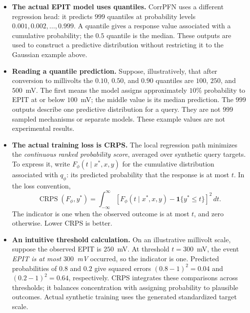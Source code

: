 \documentclass[11pt]{article}
\newenvironment{notes}
  {\begin{itemize}\setlength{\itemsep}{0.45em}\setlength{\parsep}{0pt}}
  {\end{itemize}}
\begin{document}
\begin{notes}
    \item \textbf{The actual EPIT model uses quantiles.}
    CorrPFN uses a different regression head: it predicts
    \(999\) quantiles at probability levels
    \(0.001,0.002,\ldots,0.999\).
    A quantile gives a response value associated with a cumulative
    probability; the \(0.5\) quantile is the median.
    These outputs are used to construct a predictive distribution
    without restricting it to the Gaussian example above.

    \item \textbf{Reading a quantile prediction.}
    Suppose, illustratively, that after conversion to millivolts
    the \(0.10\), \(0.50\), and \(0.90\) quantiles are
    \(100\), \(250\), and \(500\)~mV. The first means the model
    assigns approximately \(10\%\) probability to EPIT at or below
    \(100\)~mV; the middle value is its median prediction.
    The \(999\) outputs describe one predictive distribution for
    a query. They are not \(999\) sampled mechanisms or separate
    models. These example values are not experimental results.

    \item \textbf{The actual training loss is CRPS.}
    The local regression path minimizes the
    \emph{continuous ranked probability score}, averaged over
    synthetic query targets. To express it, write
    \(F_\phi(t\mid x^\ast,x,y)\) for the cumulative distribution
    associated with \(q_\phi\): its predicted probability that
    the response is at most \(t\). In the loss convention,
    \begin{equation}
        \operatorname{CRPS}(F_\phi,y^\ast)
        =
        \int_{-\infty}^{\infty}
        \left[
            F_\phi(t\mid x^\ast,x,y)
            -\mathbf{1}\{y^\ast\leq t\}
        \right]^2\,dt.
        \label{eq:crps-loss}
    \end{equation}
    The indicator is one when the observed outcome is at most
    \(t\), and zero otherwise. Lower CRPS is better.

    \item \textbf{An intuitive threshold calculation.}
    On an illustrative millivolt scale, suppose the observed EPIT
    is \(250\)~mV. At threshold \(t=300\)~mV, the event
    \emph{EPIT is at most \(300\)~mV} occurred, so the indicator is
    one. Predicted probabilities of \(0.8\) and \(0.2\) give
    squared errors \((0.8-1)^2=0.04\) and
    \((0.2-1)^2=0.64\), respectively. CRPS integrates these
    comparisons across thresholds; it balances concentration
    with assigning probability to plausible outcomes. Actual
    synthetic training uses the generated standardized target scale.


\end{notes}
\end{document}
